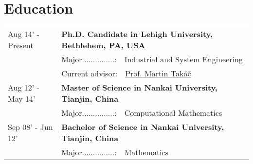 \documentclass[letters,11pt]{article} %
\begin{document}
\section{Education}
\begin{longtable}{>{\centering}p{3.3cm}|p{14cm}}    
Aug 14' - Present &  \textbf{Ph.D. Candidate in Lehigh University, Bethlehem, PA, USA}   \\
&Major...............:~~Industrial and System Engineering \\
&Current advisor:~~\href{http://mtakac.com/}{Prof. Martin Takáč} \\
Aug 12' - May 14'&  \textbf{Master of Science in Nankai University, Tianjin, China} \\
&Major...............:~~Computational Mathematics\\
Sep 08' - Jun 12' & \normalsize\textbf{Bachelor of Science in Nankai University, Tianjin, China} \\
&Major...............:~~Mathematics \\
\end{longtable}

\end{document}
